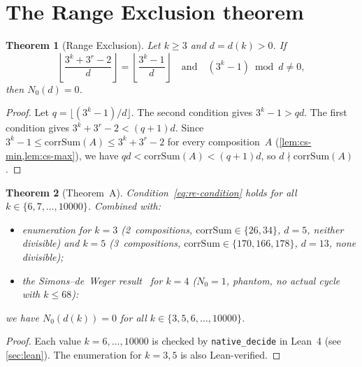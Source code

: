 \documentclass[11pt, a4paper]{amsart}
\theoremstyle{plain}
\newtheorem{theorem}{Theorem}[section]
\theoremstyle{definition}
\theoremstyle{remark}
\newcommand{\corrSum}{\mathrm{corrSum}}
\begin{document}
\section{The Range Exclusion theorem}\label{sec:range-exclusion}

\begin{theorem}[Range Exclusion]\label{thm:re}
  Let $k \geq 3$ and $d = d(k) > 0$.  If
  \begin{equation}\label{eq:re-condition}
    \left\lfloor \frac{3^k + 3^r - 2}{d} \right\rfloor
    = \left\lfloor \frac{3^k - 1}{d} \right\rfloor
    \quad\text{and}\quad
    (3^k - 1) \bmod d \neq 0,
  \end{equation}
  then $N_0(d) = 0$.
\end{theorem}

\begin{proof}
  Let $q = \lfloor (3^k - 1)/d \rfloor$.
  The second condition gives $3^k - 1 > qd$.
  The first condition gives $3^k + 3^r - 2 < (q+1)d$.
  Since $3^k - 1 \leq \corrSum(A) \leq 3^k + 3^r - 2$
  for every composition~$A$
  (\cref{lem:cs-min,lem:cs-max}), we have
  $qd < \corrSum(A) < (q+1)d$, so $d \nmid \corrSum(A)$.
\end{proof}

\begin{theorem}[Theorem~A]\label{thm:finite}
  Condition~\eqref{eq:re-condition} holds for all
  $k \in \{6, 7, \ldots, 10000\}$.
  Combined with:
  \begin{itemize}
    \item enumeration for $k = 3$ (2~compositions,
      $\corrSum \in \{26, 34\}$, $d = 5$, neither
      divisible) and $k = 5$ (3~compositions,
      $\corrSum \in \{170, 166, 178\}$, $d = 13$,
      none divisible);
    \item the Simons--de~Weger result~\cite{SimonsDeWeger2005}
      for $k = 4$ ($N_0 = 1$, phantom, no actual cycle
      with $k \leq 68$):
  \end{itemize}
  we have $N_0(d(k)) = 0$ for all
  $k \in \{3, 5, 6, \ldots, 10000\}$.
\end{theorem}

\begin{proof}
  Each value $k = 6, \ldots, 10000$ is checked by
  \texttt{native\_decide} in Lean~4 (see \cref{sec:lean}).
  The enumeration for $k = 3, 5$ is also Lean-verified.
\end{proof}
\end{document}

